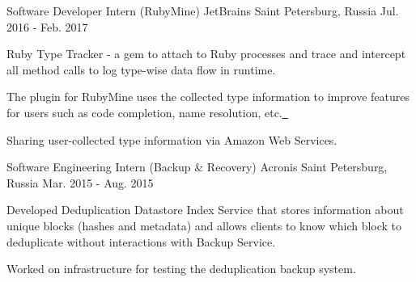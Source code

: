 \begin{cventries}
  \cventry
    {Software Developer Intern (RubyMine)} %
    {JetBrains} %
    {Saint Petersburg, Russia} %
    {Jul. 2016 - Feb. 2017} %
    {
      \begin{cvitems} %
        \item {Ruby Type Tracker - a gem to attach to Ruby processes and trace and intercept all method calls to log type-wise data flow in runtime.}
        \item {The plugin for RubyMine uses the collected type information to improve features for users such as code completion, name resolution, etc.\href{https://github.com/JetBrains/intellij-arend}{\ \faGithub}}
        \item {Sharing user-collected type information via Amazon Web Services.}
      \end{cvitems}
    }

  \cventry
    {Software Engineering Intern (Backup \& Recovery)} %
    {Acronis} %
    {Saint Petersburg, Russia} %
    {Mar. 2015 - Aug. 2015} %
    {
      \begin{cvitems} %
        \item {Developed Deduplication Datastore Index Service that stores information about unique blocks (hashes and metadata) and allows clients to know which block to deduplicate without interactions with Backup Service.}
        \item {Worked on infrastructure for testing the deduplication backup system.}
      \end{cvitems}
    }

\end{cventries}
